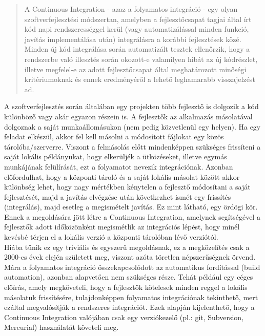 \begin{quotation}
A Continuous Integration - azaz a folyamatos integráció - egy olyan szoftverfejlesztési módszertan, amelyben a fejlesztőcsapat tagjai által írt kód napi rendszerességgel kerül (vagy automatizálással minden funkció, javítás implementálása után) integrálásra a korábbi fejlesztések közé. Minden új kód integrálása során automatizált tesztek ellenőrzik, hogy a rendszerbe való illesztés során okozott-e valamilyen hibát az új kódrészlet, illetve megfelel-e az adott fejlesztőcsapat által meghatározott minőségi kritériumoknak és ennek eredményéről a lehető leghamarabb visszajelzést ad. \cite{martin_fowler_cont_int}
\end{quotation} 

A szoftverfejlesztés során általában egy projekten több fejlesztő is dolgozik a kód különböző vagy akár egyazon részein is. A fejlesztők az alkalmazás másolatával dolgoznak a saját munkaállomásukon (nem pedig közvetlenül egy helyen). Ha egy feladat elkészül, akkor fel kell másolni a módosított fájlokat egy közös tárolóba/szerverre. Viszont a felmásolás előtt mindenképpen szükséges frissíteni a saját lokális példányukat, hogy elkerüljék a ütközéseket, illetve egymás munkájának felülírását, ezt a folyamatot nevezik integrációnak. Azonban előfordulhat, hogy a központi tároló és a saját lokális másolat között akkor különbség lehet, hogy nagy mértékben kénytelen a fejlesztő módosítani a saját fejlesztését, majd a javítás elvégzése után következhet ismét egy frissítés (integrálás), majd esetleg a megismételt javítás. Ez mint látható, egy ördögi kör. Ennek a megoldására jött létre a Continuous Integration, amelynek segítségével a fejlesztők adott időközönként megismétlik az integrációs lépést, hogy minél kevésbé térjen el a lokális verzió a központi tárolóban lévő verziótól.
\hfill\\
Hiába tűnik ez egy triviális és egyszerű megoldásnak, ez a megközelítés csak a 2000-es évek elején született meg, viszont azóta töretlen népszerűségnek örvend. Mára a folyamatos integráció összekapcsolódott az automatikus fordítással (build automation), azonban alapvetően nem szükséges része. Tehát például egy céges előírás, amely megköveteli, hogy a fejlesztők kötelesek minden reggel a lokális másolatuk frissítésére, tulajdonképpen folyamatos integrációnak tekinthető, mert ezáltal megvalósítják a rendszeres integrációt. Ezek alapján kijelenthető, hogy a Continuous Integration valójában csak egy verziókezelő (pl.: git, Subversion, Mercurial) használatát követeli meg.
